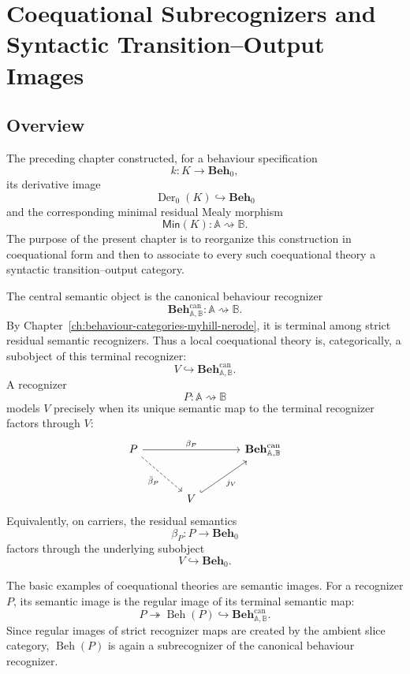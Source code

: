 \chapter{Coequational Subrecognizers and Syntactic Transition--Output Images}
\label{ch:mealy-coequations-syntactic-images}

\section{Overview}
\label{sec:coeq-overview}

The preceding chapter constructed, for a behaviour specification
\[
    k:K\to \mathbf{Beh}_0,
\]
its derivative image
\[
    \operatorname{Der}_0(K)\hookrightarrow \mathbf{Beh}_0
\]
and the corresponding minimal residual Mealy morphism
\[
    \mathsf{Min}(K):\mathbb A\rightsquigarrow\mathbb B.
\]
The purpose of the present chapter is to reorganize this construction in
coequational form and then to associate to every such coequational theory a
syntactic transition--output category.

The central semantic object is the canonical behaviour recognizer
\[
    \mathbf{Beh}^{\mathrm{can}}_{\mathbb A,\mathbb B}:
    \mathbb A\rightsquigarrow\mathbb B.
\]
By Chapter~\ref{ch:behaviour-categories-myhill-nerode}, it is terminal among
strict residual semantic recognizers. Thus a local coequational theory is,
categorically, a subobject of this terminal recognizer:
\[
    V\hookrightarrow \mathbf{Beh}^{\mathrm{can}}_{\mathbb A,\mathbb B}.
\]
A recognizer
\[
    P:\mathbb A\rightsquigarrow\mathbb B
\]
models \(V\) precisely when its unique semantic map to the terminal recognizer
factors through \(V\):
\[
\begin{tikzcd}[column sep=large, row sep=large]
    P
        \arrow[rr, "\beta_P"]
        \arrow[dr, dashed, "\bar\beta_P"']
    &&
    \mathbf{Beh}^{\mathrm{can}}_{\mathbb A,\mathbb B}
    \\
    &
    V
        \arrow[ur, hook, "j_V"']
    &
\end{tikzcd}
\]
Equivalently, on carriers, the residual semantics
\[
    \beta_P:P\to\mathbf{Beh}_0
\]
factors through the underlying subobject
\[
    V\hookrightarrow\mathbf{Beh}_0.
\]

The basic examples of coequational theories are semantic images. For a
recognizer \(P\), its semantic image is the regular image of its terminal
semantic map:
\[
    P\twoheadrightarrow \operatorname{Beh}(P)
    \hookrightarrow \mathbf{Beh}^{\mathrm{can}}_{\mathbb A,\mathbb B}.
\]
Since regular images of strict recognizer maps are created by the ambient slice
category, \(\operatorname{Beh}(P)\) is again a subrecognizer of the canonical
behaviour recognizer.

